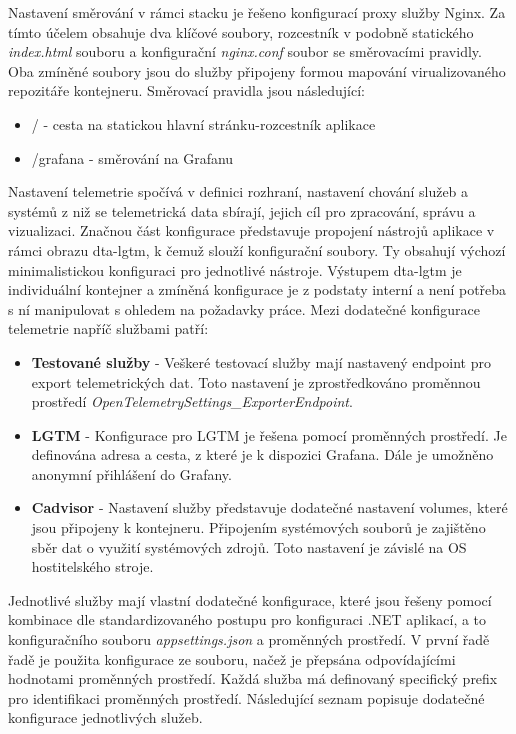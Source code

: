 Nastavení směrování v rámci stacku je řešeno konfigurací proxy služby Nginx. Za tímto účelem obsahuje dva klíčové soubory, rozcestník v podobně statického \emph{index.html} souboru a konfigurační \emph{nginx.conf} soubor se směrovacími pravidly. Oba zmíněné soubory jsou do služby připojeny formou mapování virualizovaného repozitáře kontejneru. Směrovací pravidla jsou následující:

\begin{itemize}
    \item / - cesta na statickou hlavní stránku-rozcestník aplikace
    \item /grafana - směrování na Grafanu
\end{itemize}

Nastavení telemetrie spočívá v definici rozhraní, nastavení chování služeb a systémů z niž se telemetrická data sbírají, jejich cíl pro zpracování, správu a vizualizaci. Značnou část konfigurace představuje propojení nástrojů aplikace v rámci obrazu dta-lgtm, k čemuž slouží konfigurační soubory. Ty obsahují výchozí minimalistickou konfiguraci pro jednotlivé nástroje. Výstupem dta-lgtm je individuální kontejner a zmíněná konfigurace je z podstaty interní a není potřeba s ní manipulovat s ohledem na požadavky práce. Mezi dodatečné konfigurace telemetrie napříč službami patří:

\begin{itemize}
    \item \textbf{Testované služby} - Veškeré testovací služby mají nastavený endpoint pro export telemetrických dat. Toto nastavení je zprostředkováno proměnnou prostředí \emph{OpenTelemetrySettings\_ExporterEndpoint}.
    \item \textbf{LGTM} - Konfigurace pro LGTM je řešena pomocí proměnných prostředí. Je definována adresa a cesta, z které je k dispozici Grafana. Dále je umožněno anonymní přihlášení do Grafany.
    \item \textbf{Cadvisor} - Nastavení služby představuje dodatečné nastavení volumes, které jsou připojeny k kontejneru. Připojením systémových souborů je zajištěno sběr dat o využití systémových zdrojů. Toto nastavení je závislé na OS hostitelského stroje.
\end{itemize}

Jednotlivé služby mají vlastní dodatečné konfigurace, které jsou řešeny pomocí kombinace dle standardizovaného postupu pro konfiguraci .NET aplikací, a to konfiguračního souboru \emph{appsettings.json} a proměnných prostředí. V první řadě řadě je použita konfigurace ze souboru, načež je přepsána odpovídajícími hodnotami proměnných prostředí. Každá služba má definovaný specifický prefix pro identifikaci proměnných prostředí. Následující seznam popisuje dodatečné konfigurace jednotlivých služeb.

